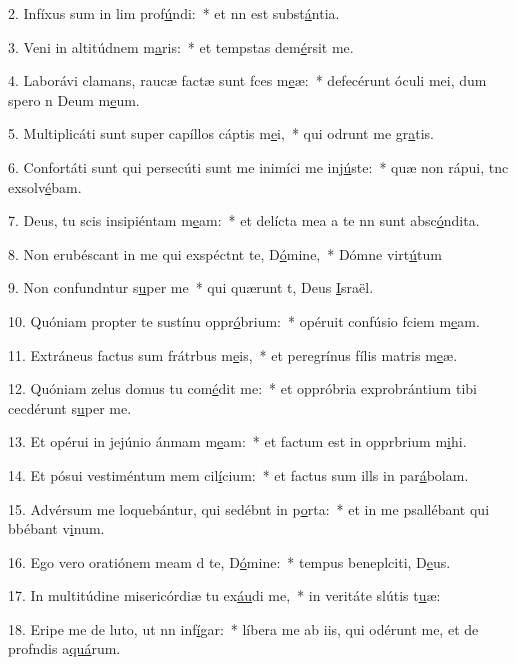 2. Infíxus sum in lim prof\uline{ú}ndi:~* et nn est subst\uline{á}ntia.\par 
3. Veni in altitúdnem m\uline{a}ris:~* et tempstas dem\uline{é}rsit me.\par 
4. Laborávi clamans, raucæ factæ sunt fces m\uline{e}æ:~* defecérunt óculi mei, dum spero n Deum m\uline{e}um.\par 
5. Multiplicáti sunt super capíllos cáptis m\uline{e}i,~* qui odrunt me gr\uline{a}tis.\par 
6. Confortáti sunt qui persecúti sunt me inimíci me inj\uline{ú}ste:~* quæ non rápui, tnc exsolv\uline{é}bam.\par 
7. Deus, tu scis insipiéntam m\uline{e}am:~* et delícta mea a te nn sunt absc\uline{ó}ndita.\par 
8. Non erubéscant in me qui exspéctnt te, D\uline{ó}mine,~* Dómne virt\uline{ú}tum\par 
9. Non confundntur s\uline{u}per me~* qui quærunt t, Deus \uline{I}sraël.\par 
10. Quóniam propter te sustínu oppr\uline{ó}brium:~* opéruit confúsio fciem m\uline{e}am.\par 
11. Extráneus factus sum frátrbus m\uline{e}is,~* et peregrínus fílis matris m\uline{e}æ.\par 
12. Quóniam zelus domus tu com\uline{é}dit me:~* et oppróbria exprobrántium tibi cecdérunt s\uline{u}per me.\par 
13. Et opérui in jejúnio ánmam m\uline{e}am:~* et factum est in opprbrium m\uline{i}hi.\par 
14. Et pósui vestiméntum mem cil\uline{í}cium:~* et factus sum ills in par\uline{á}bolam.\par 
15. Advérsum me loquebántur, qui sedébnt in p\uline{o}rta:~* et in me psallébant qui bbébant v\uline{i}num.\par 
16. Ego vero oratiónem meam d te, D\uline{ó}mine:~* tempus beneplciti, D\uline{e}us.\par 
17. In multitúdine misericórdiæ tu ex\uline{áu}di me,~* in veritáte slútis t\uline{u}æ:\par 
18. Eripe me de luto, ut nn inf\uline{í}gar:~* líbera me ab iis, qui odérunt me, et de profndis a\uline{quá}rum.\par 
